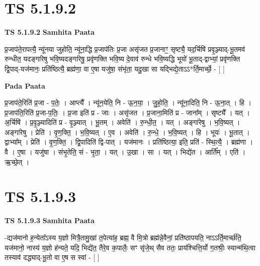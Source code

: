 \documentclass[17pt]{extarticle}
\begin{document}
\section*{ TS 5.1.9.2 }

\textbf{TS 5.1.9.2 } \newline
\textbf{Samhita Paata} \newline

प्र॒जाप॑ते॒रापत्यै॒ न्यू॑नया जुहोति॒ न्यू॑ना॒द्धि प्र॒जाप॑तिः प्र॒जा असृ॑जत प्र॒जानाꣳ॒॒ सृष्ट्यै॒ यद॒र्चिषि॑ प्रवृ॒ञ्ज्याद्-भू॒तमव॑ रुन्धीत॒ यदङ्गा॑रेषु भवि॒ष्यदङ्गा॑रेषु॒ प्रवृ॑णक्ति भवि॒ष्य दे॒वाव॑ रुन्धे भवि॒ष्यद्धि भूयो॑ भू॒ताद्-द्वाभ्यां॒ प्रवृ॑णक्ति द्वि॒पाद्-यज॑मानः॒ प्रति॑ष्ठित्यै॒ ब्रह्म॑णा॒ वा ए॒षा यजु॑षा॒ संभृ॑ता॒ यदु॒खा सा यद्भिद्ये॒ताऽऽ*र्ति॒मार्च्छे॒ - [  ] \newline

\textbf{Pada Paata} \newline

प्र॒जाप॑ते॒रिति॑ प्र॒जा - प॒तेः॒ । आप्त्यै᳚ । न्यू॑न॒येति॒ नि - ऊ॒न॒या॒ । जु॒हो॒ति॒ । न्यू॑ना॒दिति॒ नि - ऊ॒ना॒त् । हि । प्र॒जाप॑ति॒रिति॑ प्र॒जा-प॒तिः॒ । प्र॒जा इति॑ प्र - जाः । असृ॑जत । प्र॒जाना॒मिति॑ प्र - जाना᳚म् । सृष्ट्यै᳚ । यत् । अ॒र्चिषि॑ । प्र॒वृ॒ञ्ज्यादिति॑ प्र - वृ॒ञ्ज्यात् । भू॒तम् । अवेति॑ । रु॒न्धी॒त॒ । यत् । अङ्गा॑रेषु । भ॒वि॒ष्यत् । अङ्गा॑रेषु । प्रेति॑ । वृ॒ण॒क्ति॒ । भ॒वि॒ष्यत् । ए॒व । अवेति॑ । रु॒न्धे॒ । भ॒वि॒ष्यत् । हि । भूयः॑ । भू॒तात् । द्वाभ्या᳚म् । प्रेति॑ । वृ॒ण॒क्ति॒ । द्वि॒पादिति॑ द्वि-पात् । यज॑मानः । प्रति॑ष्ठित्या॒ इति॒ प्रति॑ - स्थि॒त्यै॒ । ब्रह्म॑णा । वै । ए॒षा । यजु॑षा । संभृ॒तेति॒ सं - भृ॒ता॒ । यत् । उ॒खा । सा । यत् । भिद्ये॑त । आर्ति᳚म् । एति॑ । ऋ॒च्छे॒त् ।  \newline




\section*{ TS 5.1.9.3 }

\textbf{TS 5.1.9.3 } \newline
\textbf{Samhita Paata} \newline

-द्यज॑मानो ह॒न्येता᳚ऽस्य य॒ज्ञो मित्रै॒तामु॒खां त॒पेत्या॑ह॒ ब्रह्म॒ वै मि॒त्रो ब्रह्म॑न्ने॒वैनां॒ प्रति॑ष्ठापयति॒ नाऽऽर्ति॒मार्च्छ॑ति॒ यज॑मानो॒ नास्य॑ य॒ज्ञो ह॑न्यते॒ यदि॒ भिद्ये॑त॒ तैरे॒व क॒पालैः॒ सꣳ सृ॑जे॒थ् सैव ततः॒ प्राय॑श्चित्ति॒र्यो ग॒तश्रीः॒ स्यान्म॑थि॒त्वा तस्याव॑ दद्ध्याद्-भू॒तो वा ए॒ष स स्वां - [  ] \newline
\end{document}
